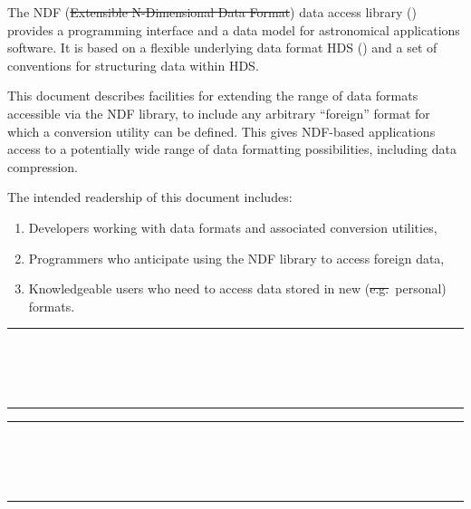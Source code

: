The NDF (\st{Extensible N-Dimensional Data Format\/}) data access
library () provides a programming interface and
a data model for astronomical applications software. It is based on a
flexible underlying data format HDS () and a set
of conventions for structuring data within HDS.

This document describes facilities for extending the range of data
formats accessible via the NDF library, to include any arbitrary
``foreign'' format for which a conversion utility can be defined.
This gives NDF-based applications access to a potentially wide range
of data formatting possibilities, including data compression.

The intended readership of this document includes:
\begin{enumerate}
\item Developers working with data formats and associated conversion
utilities,
\item Programmers who anticipate using the NDF library to access foreign data,
\item Knowledgeable users who need to access data stored in new
(\st{e.g.}\ personal) formats.
\end{enumerate}
 \newpage
 \begin{latexonly}
   \null\vspace {5mm}
   \begin {center}
   \rule{80mm}{0.5mm} \\ [1ex]
   {\Large\bf \stardoctitle \\ [2.5ex]
              \stardocversion} \\ [2ex]
   \rule{80mm}{0.5mm}
   \end{center}
   \setlength{\parskip}{0mm}
   \latexonlytoc
   \setlength{\parskip}{\medskipamount}
   \markright{\stardocname}
 \end{latexonly}

\newpage
\renewcommand{\thepage}{\arabic{page}}
\setcounter{page}{1}
\begin{latexonly}
   \null\vspace {5mm}
   \begin {center}
   \rule{80mm}{0.5mm} \\ [1ex]
   {\Large\bf \stardoctitle \\ [2.5ex]
              \stardocversion} \\ [2ex]
   \rule{80mm}{0.5mm}
   \end{center}
   \vspace{30mm}
\end{latexonly}

